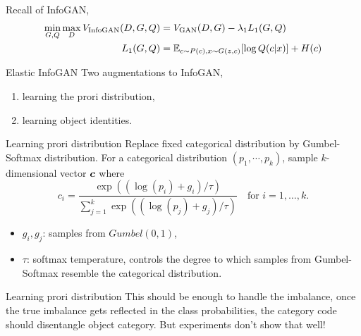 \documentclass[xcolor={svgnames}]{beamer}
\begin{document}

\begin{frame}
  Recall of InfoGAN,
  \[
  \begin{split}
    \min_{G,Q} \max_D V_{\text{InfoGAN}}(D, G, Q) &= 
    V_{\text{GAN}}(D,G) - \lambda_1 L_1(G,Q) \\
        L_1(G,Q) &= \mathbb{E}{}_{c\sim P(c), x\sim G(z,c)}[\log Q(c|x)] + H(c)
  \end{split}
  \]
\end{frame}


\begin{frame}{Elastic InfoGAN}
  Two augmentations to InfoGAN,
  \begin{enumerate}
    \item learning the prori distribution,
    \item learning object identities.
  \end{enumerate}
\end{frame}


\begin{frame}{Learning prori distribution}
  Replace fixed categorical distribution by Gumbel-Softmax distribution. For a
  categorical distribution $(p_1, \cdots, p_k)$, sample $k$-dimensional vector
  $\boldsymbol{c}$ where
  \[
    c_i = \frac{\exp((\log(p_i) + g_i) / \tau)}
    {\sum_{j=1}^k \exp((\log(p_j) + g_j) / \tau)}
    \quad \text{for } i = 1, \dots, k.
  \]

  \begin{itemize}
    \item $g_i, g_j$: samples from $Gumbel(0,1)$,
    \item $\tau$: softmax temperature, controls the degree to which samples 
      from Gumbel-Softmax resemble the categorical distribution.
  \end{itemize}
\end{frame}


\begin{frame}{Learning prori distribution}
  This should be enough to handle the imbalance, once the true imbalance gets
  reflected in the class probabilities, the category code should disentangle
  object category. But experiments don't show that well!
  

\end{frame}
\end{document}
